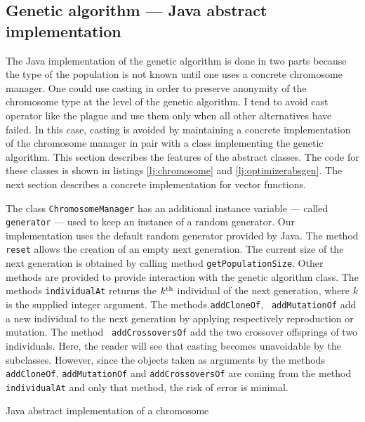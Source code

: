 \documentclass[twoside]{book}
\begin{document}
\subsection{Genetic algorithm --- Java abstract implementation}
 The Java
implementation of the genetic algorithm is done in two parts
because the type of the population is not known until one uses a
concrete chromosome manager. One could use casting in order to
preserve anonymity of the chromosome type at the level of the
genetic algorithm. I tend to avoid cast operator like the plague
and use them only when all other alternatives have failed. In this
case, casting is avoided by maintaining a concrete implementation
of the chromosome manager in pair with a class implementing the
genetic algorithm. This section describes the features of the
abstract classes. The code for these classes is shown in listings
\ref{lj:chromosome} and \ref{lj:optimizerabsgen}. The next section
describes a concrete implementation for vector functions.

The class {\tt ChromosomeManager} has an additional instance
variable --- called {\tt generator} --- used to keep an instance
of a random generator. Our implementation uses the default random
generator provided by Java. The method {\tt reset} allows the
creation of an empty next generation. The current size of the next
generation is obtained by calling method {\tt getPopulationSize}.
Other methods are provided to provide interaction with the genetic
algorithm class. The methods {\tt individualAt} returns the $k^{\mathop{\rm th}}$
individual of the next generation, where $k$ is the supplied
integer argument. The methods {\tt addCloneOf}, {\tt
addMutationOf} add a new individual to the next generation by
applying respectively reproduction or mutation. The method {\tt
addCrossoversOf} add the two crossover offsprings of two
individuals. Here, the reader will see that casting becomes
unavoidable by the subclasses. However, since the objects taken as
arguments by the methods {\tt addCloneOf}, {\tt addMutationOf} and
{\tt addCrossoversOf} are coming from the method {\tt
individualAt} and only that method, the risk of error is minimal.

\begin{listing} Java abstract implementation of a chromosome
\label{lj:chromosome}

\end{listing}
\end{document}
